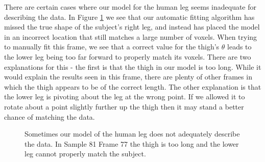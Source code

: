 There are certain cases where our model for the human leg seems inadequate for describing the data.
In Figure \ref{FittingErrors} we see that our automatic fitting algorithm has missed the true shape of the subject's right leg, and instead has placed the model in an incorrect location that still matches a large number of voxels.
When trying to manually fit this frame, we see that a correct value for the thigh's $\theta$ leads to the lower leg being too far forward to properly match its voxels.
There are two explanations for this - the first is that the thigh in our model is too long.
While it would explain the results seen in this frame, there are plenty of other frames in which the thigh appears to be of the correct length.
The other explanation is that the lower leg is pivoting about the leg at the wrong point.
If we allowed it to rotate about a point slightly further up the thigh then it may stand a better chance of matching the data.


\begin{figure}[bp]
	\centering
	\quad
	
	\caption{Sometimes our model of the human leg does not adequately describe the data.
		In Sample 81 Frame 77 the thigh is too long and the lower leg cannot properly match the subject.}
	\label{FittingErrors}
\end{figure}
